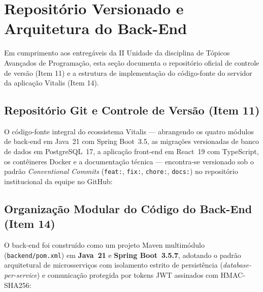 
\section{Repositório Versionado e Arquitetura do Back-End}
\label{sec:repositorio_backend}

Em cumprimento aos entregáveis da II Unidade da disciplina de Tópicos Avançados de Programação, esta seção documenta o repositório oficial de controle de versão (Item 11) e a estrutura de implementação do código-fonte do servidor da aplicação Vitalis (Item 14).

\subsection{Repositório Git e Controle de Versão (Item 11)}

O código-fonte integral do ecossistema Vitalis --- abrangendo os quatro módulos de back-end em Java~21 com Spring Boot~3.5, as migrações versionadas de banco de dados em PostgreSQL~17, a aplicação front-end em React~19 com TypeScript, os contêineres Docker e a documentação técnica --- encontra-se versionado sob o padrão \textit{Conventional Commits} (\texttt{feat:}, \texttt{fix:}, \texttt{chore:}, \texttt{docs:}) no repositório institucional da equipe no GitHub:


\subsection{Organização Modular do Código do Back-End (Item 14)}

O back-end foi construído como um projeto Maven multimódulo (\texttt{backend/pom.xml}) em \textbf{Java~21} e \textbf{Spring Boot~3.5.7}, adotando o padrão arquitetural de microsserviços com isolamento estrito de persistência (\textit{database-per-service}) e comunicação protegida por tokens JWT assinados com HMAC-SHA256:

